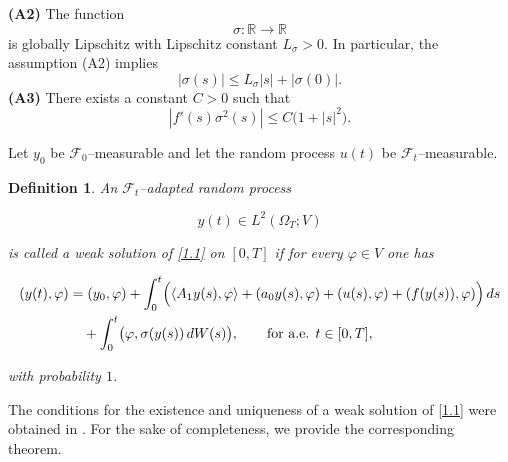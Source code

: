 \documentclass[a4paper,12pt]{article}
\newtheorem{definition}{Definition}[section]
\numberwithin{equation}{section}
\begin{document}
\medskip

\noindent
{\bf (A2)} The function
\[
\sigma:\mathbb{R}\to\mathbb{R}
\]
is globally Lipschitz with Lipschitz constant $L_\sigma>0$.
In particular, the assumption (A2) implies
\[
|\sigma(s)|
\le
L_\sigma |s| + |\sigma(0)|.
\]
\medskip
\noindent
{\bf (A3)} There exists a constant $C>0$ such that
\begin{equation}
|f'(s)\sigma^2(s)|
\le
C\bigl(1+|s|^2\bigr).
\label{2.4}
\end{equation}

\medskip
Let $y_0$ be $\mathcal{F}_0$--measurable and let the random process
$u(t)$ be $\mathcal{F}_t$--measurable.

\begin{definition}\label{Def:2.1}
An $\mathcal{F}_t$--adapted random process

\[
y(t)\in L^2(\Omega_T;V)
\]

is called a weak solution of \eqref{1.1} on $[0,T]$ if for every
$\varphi\in V$ one has

\begin{equation}
\begin{aligned}
(y(t),\varphi)
&=
(y_0,\varphi)
+
\int_0^t
\Bigl(
\langle A_1y(s),\varphi\rangle
+
(a_0y(s),\varphi)
+
(u(s),\varphi)
+
(f(y(s)),\varphi)
\Bigr)\,ds
\\
&\quad
+
\int_0^t
\bigl(
\varphi,\sigma(y(s))\,dW(s)
\bigr),
\qquad
\text{for a.e. } t\in[0,T],
\end{aligned}
\label{2.5}
\end{equation}

with probability $1$.
\end{definition}

The conditions for the existence and uniqueness of a weak
solution of \eqref{1.1} were obtained in \cite{20}. For the sake of completeness, we provide the corresponding theorem.
\end{document}
